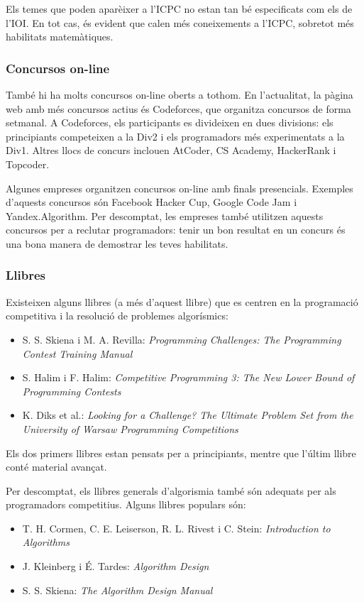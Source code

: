 Els temes que poden aparèixer a l'ICPC no estan tan bé
especificats com els de l'IOI.
En tot cas, és evident que calen més coneixements
a l'ICPC, sobretot més habilitats matemàtiques.

\subsubsection{Concursos on-line}

També hi ha molts concursos on-line oberts a tothom.
En l'actualitat, la pàgina web amb més concursos actius és Codeforces,
que organitza concursos de forma setmanal.
A Codeforces, els participants es divideixen en dues divisions:
els principiants competeixen a la Div2 i els programadors més experimentats a
la Div1.
Altres llocs de concurs inclouen AtCoder, CS Academy, HackerRank i Topcoder.

Algunes empreses organitzen concursos on-line amb finals presencials.
Exemples d'aquests concursos són Facebook Hacker Cup,
Google Code Jam i Yandex.Algorithm.
Per descomptat, les empreses també utilitzen aquests concursos per a reclutar
programadors:
tenir un bon resultat en un concurs és una bona manera de demostrar les teves habilitats.

\subsubsection{Llibres}

Existeixen alguns llibres (a més d'aquest llibre) que
es centren en la programació competitiva i la resolució de problemes
algorísmics:

\begin{itemize}
\item S. S. Skiena i M. A. Revilla:
\emph{Programming Challenges: The Programming Contest Training Manual} \cite{ski03}
\item S. Halim i F. Halim:
\emph{Competitive Programming 3: The New Lower Bound of Programming Contests} \cite{hal13}
\item K. Diks et al.: \emph{Looking for a Challenge? The Ultimate Problem Set from
the University of Warsaw Programming Competitions} \cite{dik12}
\end{itemize}

Els dos primers llibres estan pensats per a principiants,
mentre que l'últim llibre conté material avançat.

Per descomptat, els llibres generals d'algorismia també són adequats
per als programadors competitius.
Alguns llibres populars són:

\begin{itemize}
\item T. H. Cormen, C. E. Leiserson, R. L. Rivest i C. Stein:
\emph{Introduction to Algorithms} \cite{cor09}
\item J. Kleinberg i É. Tardes:
\emph{Algorithm Design} \cite{kle05}
\item S. S. Skiena:
\emph{The Algorithm Design Manual} \cite{ski08}
\end{itemize}
